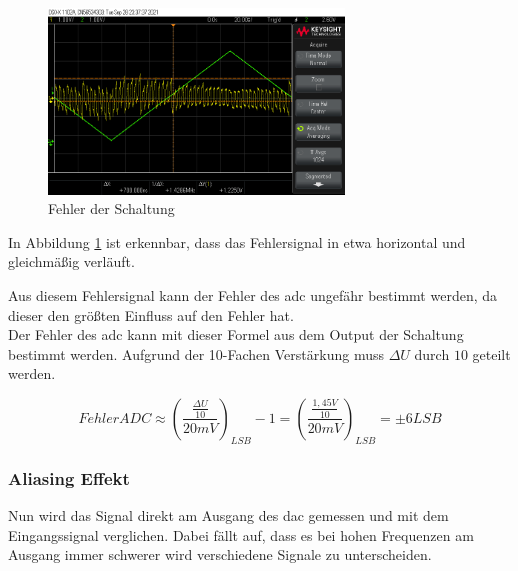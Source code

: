 \documentclass[12pt, a4paper, ngerman]{article}
\begin{document}
\begin{figure}
  \centering
  \includegraphics[width=0.7\textwidth]{scope_38.png}
  \caption{Fehler der Schaltung}
  \label{plot:fehler1}
\end{figure}

In Abbildung \ref{plot:fehler1} ist erkennbar,
dass das Fehlersignal in etwa horizontal und gleichmäßig verläuft.

Aus diesem Fehlersignal kann der Fehler des \ac{adc} ungefähr bestimmt werden,
da dieser den größten Einfluss auf den Fehler hat. \\
Der Fehler des \ac{adc} kann mit dieser Formel aus dem Output der Schaltung bestimmt werden.
Aufgrund der 10-Fachen Verstärkung muss $\Delta U$ durch $10$ geteilt werden.

$$
  Fehler ADC \approx (\frac{\frac{\Delta U}{10}}{20mV})_{LSB}-1 = (\frac{\frac{1,45V}{10}}{20mV})_{LSB} = \pm 6 LSB
$$

\subsubsection{Aliasing Effekt}

Nun wird das Signal direkt am Ausgang des \ac{dac} gemessen und mit dem Eingangssignal verglichen.
Dabei fällt auf, dass es bei hohen Frequenzen am Ausgang immer schwerer wird verschiedene Signale zu unterscheiden.
\end{document}
